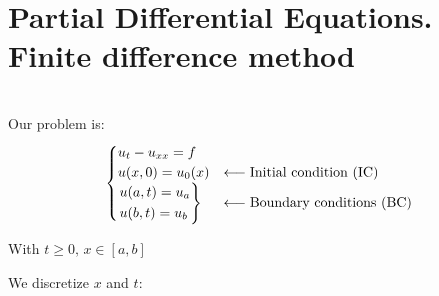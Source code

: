 \section{Partial Differential Equations. Finite difference method}

\begin{example}\label{example4.0.1}
  \-\\Our problem is:
  \[
    \begin{cases}
      u_t - u_{xx} = f\\
      u(x,0) = u_0(x) &\longleftarrow\text{Initial condition (IC)}\\
      \begin{rcases}
        u(a,t) = u_a \\
        u(b,t) = u_b
      \end{rcases} &\longleftarrow\text{Boundary conditions (BC)}\\
    \end{cases}
  \]
  
  With $t\geq 0, \, x\in[a,b]$
\end{example}

We discretize $x$ and $t$:

